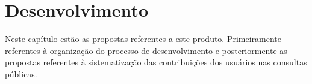 \chapter{Desenvolvimento}
Neste capítulo estão as propostas referentes a este produto. Primeiramente referentes à organização do processo de desenvolvimento e posteriormente as propostas referentes à sistematização das contribuições dos usuários nas consultas públicas.



